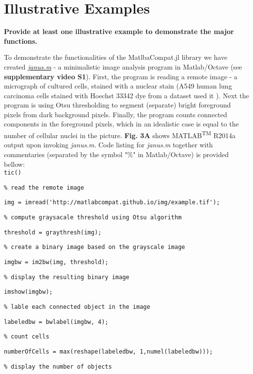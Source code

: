 \section{Illustrative Examples}

\textbf{Provide at least one illustrative example to demonstrate the major functions.}

To demonstrate the functionalities of the MatlbaCompat.jl library we have created \textit{\textit{\href{https://github.com/MatlabCompat/MatlabCompat.jl/blob/master/test/janus.m}{janus.m}}} - a minimalistic image analysis program in Matlab/Octave (see \textbf{supplementary video S1}). First, the program is reading a remote image - a micrograph of cultured cells, stained with a nuclear stain (A549 human lung carcinoma cells stained with Hoechst 33342 dye from a dataset used it \cite{22787215}). Next the program is using Otsu \cite{otsu1975threshold} thresholding to segment (separate) bright foreground pixels from dark background pixels. Finally, the program counts connected components in the foreground pixels, which in an idealistic case is equal to the number of cellular nuclei in the picture. \textbf{Fig. 3A} shows MATLAB\textsuperscript{TM} R2014a output upon invoking \textit{janus.m}. Code listing for \textit{janus.m} together with commentaries (separated by the symbol "\%" in Matlab/Octave) is provided bellow:\\



\verb|tic()|

\verb|% read the remote image|

\verb|img = imread('http://matlabcompat.github.io/img/example.tif');|

\verb|% compute graysacale threshold using Otsu algorithm|

\verb|threshold = graythresh(img);|

\verb|% create a binary image based on the grayscale image|

\verb|imgbw = im2bw(img, threshold);|

\verb|% display the resulting binary image|

\verb|imshow(imgbw);|

\verb|% lable each connected object in the image|

\verb|labeledbw = bwlabel(imgbw, 4);|

\verb|% count cells|

\verb|numberOfCells = max(reshape(labeledbw, 1,numel(labeledbw)));|

\verb|% display the number of objects|

